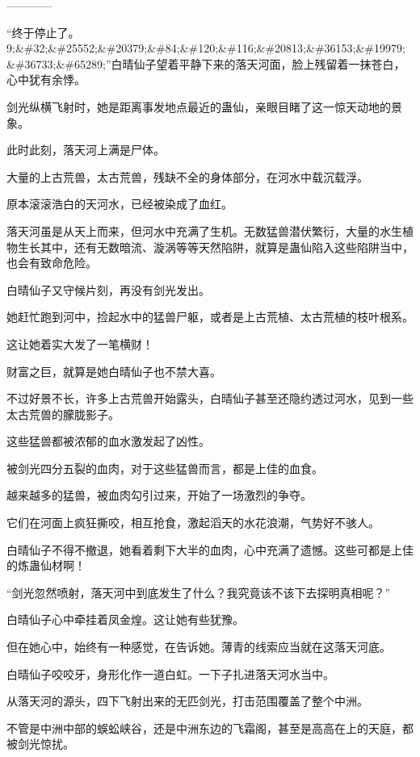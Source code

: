 
\begin{this_body}

------------

“终于停止了。9;\&\#32;\&\#25552;\&\#20379;\&\#84;\&\#120;\&\#116;\&\#20813;\&\#36153;\&\#19979;\&\#36733;\&\#65289;”白晴仙子望着平静下来的落天河面，脸上残留着一抹苍白，心中犹有余悸。

剑光纵横飞射时，她是距离事发地点最近的蛊仙，亲眼目睹了这一惊天动地的景象。

此时此刻，落天河上满是尸体。

大量的上古荒兽，太古荒兽，残缺不全的身体部分，在河水中载沉载浮。

原本滚滚浩白的天河水，已经被染成了血红。

落天河虽是从天上而来，但河水中充满了生机。无数猛兽潜伏繁衍，大量的水生植物生长其中，还有无数暗流、漩涡等等天然陷阱，就算是蛊仙陷入这些陷阱当中，也会有致命危险。

白晴仙子又守候片刻，再没有剑光发出。

她赶忙跑到河中，捡起水中的猛兽尸躯，或者是上古荒植、太古荒植的枝叶根系。

这让她着实大发了一笔横财！

财富之巨，就算是她白晴仙子也不禁大喜。

不过好景不长，许多上古荒兽开始露头，白晴仙子甚至还隐约透过河水，见到一些太古荒兽的朦胧影子。

这些猛兽都被浓郁的血水激发起了凶性。

被剑光四分五裂的血肉，对于这些猛兽而言，都是上佳的血食。

越来越多的猛兽，被血肉勾引过来，开始了一场激烈的争夺。

它们在河面上疯狂撕咬，相互抢食，激起滔天的水花浪潮，气势好不骇人。

白晴仙子不得不撤退，她看着剩下大半的血肉，心中充满了遗憾。这些可都是上佳的炼蛊仙材啊！

“剑光忽然喷射，落天河中到底发生了什么？我究竟该不该下去探明真相呢？”

白晴仙子心中牵挂着凤金煌。这让她有些犹豫。

但在她心中，始终有一种感觉，在告诉她。薄青的线索应当就在这落天河底。

白晴仙子咬咬牙，身形化作一道白虹。一下子扎进落天河水当中。

从落天河的源头，四下飞射出来的无匹剑光，打击范围覆盖了整个中洲。

不管是中洲中部的蜈蚣峡谷，还是中洲东边的飞霜阁，甚至是高高在上的天庭，都被剑光惊扰。


\end{this_body}
